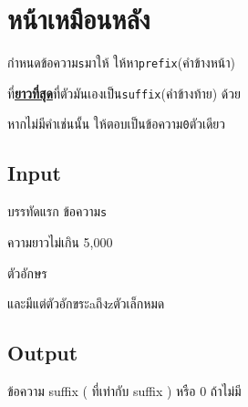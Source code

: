 \documentclass{article}
\begin{document}
\section*{หน้าเหมือนหลัง}

กำหนดข้อความ\texttt{s}มาให้ ให้หา\texttt{prefix}(คำข้างหน้า)

ที่\ul{\textbf{ยาวที่สุด}}ที่ตัวมันเองเป็น\texttt{suffix}(คำข้างท้าย) ด้วย



หากไม่มีคำเช่นนั้น ให้ตอบเป็นข้อความ\texttt{0}ตัวเดียว\\



\subsection*{Input}
บรรทัดแรก ข้อความ\texttt{s}{ความยาวไม่เกิน 5,000

ตัวอักษร}และมีแต่ตัวอักขระaถึงzตัวเล็กหมด\\



\subsection*{Output}
ข้อความ suffix ( ที่เท่ากับ suffix ) หรือ 0 ถ้าไม่มี\\
\end{document}
